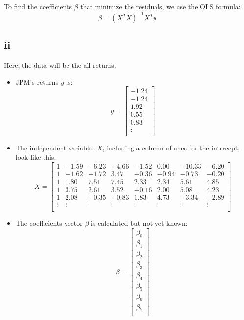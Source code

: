 \documentclass{article}
\begin{document}
To find the coefficients \( \beta \) that minimize the residuals, we use the OLS formula:
\[
    \beta = (X^T X)^{-1} X^T y
\]
\subsection*{ii}
Here, the data will be the all returns.

\begin{itemize}
    \item JPM's returns \( y \) is:
          \[
              y = \begin{bmatrix}
                  -1.24  \\
                  -1.24  \\
                  1.92   \\
                  0.55   \\
                  0.83   \\
                  \vdots \\
              \end{bmatrix}
          \]

    \item The independent variables \( X \), including a column of ones for the intercept, look like this:
          \[
              X = \begin{bmatrix}
                  1      & -1.59  & -6.23  & -4.66  & -1.52  & 0.00   & -10.33 & -6.20  \\
                  1      & -1.62  & -1.72  & 3.47   & -0.36  & -0.94  & -0.73  & -0.20  \\
                  1      & 1.80   & 7.51   & 7.45   & 2.33   & 2.34   & 5.61   & 4.85   \\
                  1      & 3.75   & 2.61   & 3.52   & -0.16  & 2.00   & 5.08   & 4.23   \\
                  1      & 2.08   & -0.35  & -0.83  & 1.83   & 4.73   & -3.34  & -2.89  \\
                  \vdots & \vdots & \vdots & \vdots & \vdots & \vdots & \vdots & \vdots \\
              \end{bmatrix}
          \]

    \item The coefficients vector \( \beta \) is calculated but not yet known:
          \[
              \beta = \begin{bmatrix}
                  \beta_0 \\
                  \beta_1 \\
                  \beta_2 \\
                  \beta_3 \\
                  \beta_4 \\
                  \beta_5 \\
                  \beta_6 \\
                  \beta_7 \\
              \end{bmatrix}
          \]
\end{itemize}
\end{document}
